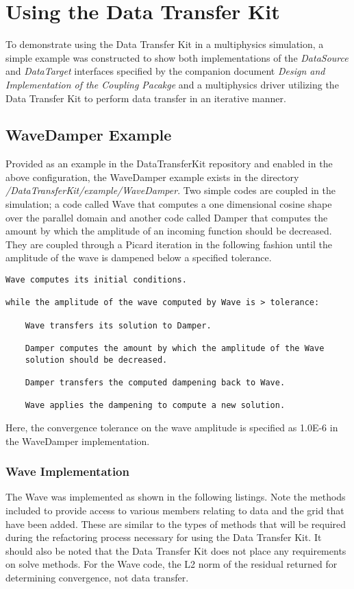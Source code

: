 \documentclass[letterpaper]{article}
\begin{document}
\section{Using the Data Transfer Kit}
To demonstrate using the Data Transfer Kit in a multiphysics
simulation, a simple example was constructed to show both
implementations of the {\sl DataSource} and {\sl DataTarget}
interfaces specified by the companion document {\sl Design and
  Implementation of the Coupling Pacakge} and a multiphysics driver
utilizing the Data Transfer Kit to perform data transfer in an
iterative manner. 

\subsection{WaveDamper Example}
Provided as an example in the DataTransferKit repository and enabled in the
above configuration, the WaveDamper example exists in the directory
{\sl /DataTransferKit/example/WaveDamper}. Two simple codes are coupled in the
simulation; a code called Wave that computes a one dimensional cosine
shape over the parallel domain and another code called Damper that
computes the amount by which the amplitude of an incoming function
should be decreased. They are coupled through a Picard iteration in
the following fashion until the amplitude of the wave is dampened
below a specified tolerance.

\begin{verbatim}
Wave computes its initial conditions.

while the amplitude of the wave computed by Wave is > tolerance:

    Wave transfers its solution to Damper.

    Damper computes the amount by which the amplitude of the Wave
    solution should be decreased.

    Damper transfers the computed dampening back to Wave.

    Wave applies the dampening to compute a new solution.
\end{verbatim}

Here, the convergence tolerance on the wave amplitude is specified as
1.0E-6 in the WaveDamper implementation.

\subsubsection{Wave Implementation}
The Wave was implemented as shown in the following listings. Note the
methods included to provide access to various members relating to data
and the grid that have been added. These are similar to the types of
methods that will be required during the refactoring process necessary
for using the Data Transfer Kit. It should also be noted that the
Data Transfer Kit does not place any requirements on solve methods. For
the Wave code, the L2 norm of the residual returned for determining
convergence, not data transfer.
\end{document}
